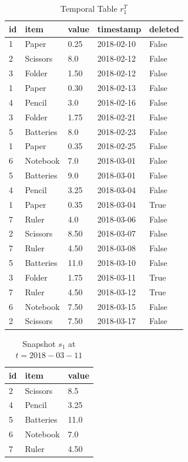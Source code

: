 			\begin{center}
			\begin{table}
				\centering
				\caption{Temporal Table $r_1^T$}
				\label {table:temporal_table_3}
				\begin{tabular}{p{1cm}p{2cm}p{3cm}p{3cm}p{2cm}}
					\hline
					id & item & value  & timestamp  & deleted\\ \hline
					1 & Paper & 0.25  & 2018-02-10  &  False \\  
					2 & Scissors & 8.0  & 2018-02-12  &  False \\
					3 & Folder & 1.50  & 2018-02-12  &  False \\
					1 & Paper & 0.30  & 2018-02-13  &  False \\
					4 & Pencil & 3.0  & 2018-02-16  &  False \\
					3 & Folder & 1.75  & 2018-02-21  &  False \\
					5 & Batteries & 8.0  & 2018-02-23  &  False \\
					1 & Paper & 0.35  & 2018-02-25  &  False \\
					6 & Notebook & 7.0  & 2018-03-01  &  False \\
					5 & Batteries & 9.0  & 2018-03-01  &  False \\
					4 & Pencil & 3.25  & 2018-03-04  &  False \\
					1 & Paper & 0.35  &  2018-03-04 & True \\
					7 & Ruler & 4.0  & 2018-03-06  &  False \\
					2 & Scissors & 8.50  & 2018-03-07  &  False \\
					7 & Ruler & 4.50  & 2018-03-08  &  False\\
					5 & Batteries & 11.0  & 2018-03-10 & False \\
					3 & Folder & 1.75  & 2018-03-11 & True \\
					7 & Ruler & 4.50  & 2018-03-12  & True  \\
					6 & Notebook & 7.50  & 2018-03-15 & False \\ 
					2 & Scissors & 7.50  & 2018-03-17 & False \\ \hline
				\end{tabular}
			\end{table}
			\begin{table}
				\centering
				\caption{Snapshot $s_1$ at $t = 2018-03-11$}
				\label{table:snapshot_s1}
				\begin{tabular}{p{4cm}p{4cm}p{4cm}}
					\hline
					id & item  & value  \\ \hline
					2 & Scissors & 8.5   \\ 
					4 & Pencil & 3.25   \\ 
					5 & Batteries & 11.0   \\ 
					6 & Notebook & 7.0 \\ 
					7 & Ruler & 4.50   \\ \hline
				\end{tabular}
			\end{table}
			\end{center}

